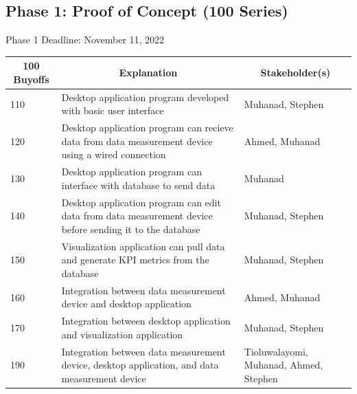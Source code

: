 \documentclass[12pt,titlepage]{article}
\begin{document}
\noindent
\subsection{Phase 1: Proof of Concept (100 Series)}
Phase 1 Deadline: November 11, 2022\\
\begin{table}[H]
  \centering
  \begin{tabular}{|p{2cm}|p{10cm}|p{2cm}|}
  \hline
  \multicolumn{1}{|c|}{\textbf{100 Buyoffs}} & \multicolumn{1}{c|}{\textbf{Explanation}} & \multicolumn{1}{|c|}{\textbf{Stakeholder(s)}}
  \\ \hline
  110
  & Desktop application program developed with basic user interface
  & Muhanad, Stephen
  \newline                                
  
  \\ \hline
  120                              
  & Desktop application program can recieve data from data measurement device using a wired connection
  & Ahmed, Muhanad
  \newline                                

  \\ \hline
  130                          
  & Desktop application program can interface with database to send data
  & Muhanad
  \newline                                

  \\ \hline
  140                                
  & Desktop application program can edit data from data measurement device before sending it to the database
  & Muhanad, Stephen 
  \newline                            

    \\ \hline
  150                                
  & Visualization application can pull data and generate KPI metrics from the database
  & Muhanad, Stephen  
  \newline 

  \\ \hline
  160                                
  & Integration between data measurement device and desktop application
  & Ahmed, Muhanad 
  \newline 

  \\ \hline
  170                                
  & Integration between desktop application and visualization application
  & Muhanad, Stephen  
  \newline 

  \\ \hline
  190                                
  & Integration between data measurement device, desktop application, and data measurement device
  & Tioluwalayomi, Muhanad, Ahmed, Stephen 
  \newline 
  \\ \hline


  \end{tabular}
\end{table}
\end{document}

